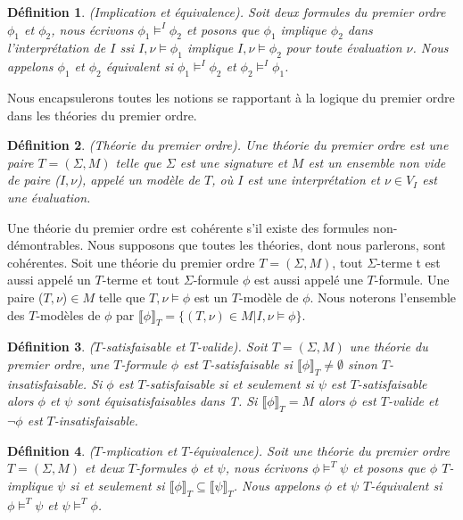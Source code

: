 \documentclass[11pt,openany]{article}
\newcommand\phibra{\llbracket\phi\rrbracket}
\newcommand\psibra{\llbracket\psi\rrbracket}
\newtheorem{definition}{D\'efinition}[subsection]
\begin{document}
\begin{definition}
(Implication et \'equivalence). Soit deux formules du premier ordre $\phi_{1}$ et $\phi_{2}$, nous \'ecrivons $\phi_{1}\models^{I}\phi_{2}$ et posons que $\phi_{1}$ implique $\phi_{2}$ dans l'interpr\'etation de $I$ ssi $I,\nu\models\phi_{1}$ implique $I,\nu\models\phi_{2}$ pour toute \'evaluation $\nu$. Nous appelons $\phi_{1}$  et $\phi_{2}$  \'equivalent si $\phi_{1}\models^{I}\phi_{2}$ et $\phi_{2}\models^{I}\phi_{1}$.
\end{definition}

	Nous encapsulerons toutes les notions se rapportant \`a la logique du premier ordre dans les th\'eories du premier ordre.

\begin{definition}
(Th\'eorie du premier ordre). Une th\'eorie du premier ordre est une paire $T=( \Sigma,M)$ telle que $ \Sigma$ est une signature et $M$ est un ensemble non vide de paire ($I,\nu$), appel\'e un mod\`ele de $T$, o\`u $I$ est une interpr\'etation et $\nu\in V_{I}$ est une \'evaluation.
\end{definition}

Une th\'eorie du premier ordre est coh\'erente s'il existe des formules non-d\'emontrables. Nous supposons que toutes les th\'eories, dont nous parlerons, sont coh\'erentes. Soit une th\'eorie du premier ordre $T = ( \Sigma,M)$, tout $ \Sigma$-terme t est aussi appel\'e un $T$-terme et tout $ \Sigma$-formule $\phi$ est aussi appel\'e une $T$-formule. Une paire ($T,\nu$)$\in M$ telle que $T,\nu\models\phi$ est un $T$-mod\`ele de $\phi$. Nous noterons l'ensemble des $T$-mod\`eles de $\phi$ par $\phibra_{T} = \{(T,\nu)\in M | I,\nu\models\phi\}$.

\begin{definition}
($T$-satisfaisable et $T$-valide). Soit $T = (\Sigma,M)$ une th\'eorie du premier ordre, une $T$-formule $\phi$ est $T$-satisfaisable si $\phibra_{T} \neq \emptyset$ sinon $T$-insatisfaisable. Si $\phi$ est $T$-satisfaisable si et seulement si $\psi$ est $T$-satisfaisable alors $\phi$ et $\psi$ sont \'equisatisfaisables dans T. Si $\phibra_{T} = M$ alors $\phi$ est $T$-valide et $\neg\phi$ est $T$-insatisfaisable.
\end{definition}

\begin{definition}
($T$-mplication et $T$-\'equivalence). Soit une th\'eorie du premier ordre $T = ( \Sigma,M)$ et deux $T$-formules $\phi$ et $\psi$, nous \'ecrivons $\phi\models^{T}\psi$ et posons que $\phi$ $T$-implique $\psi$ si et seulement si $\phibra_{T}\subseteq \psibra_{T}$. Nous appelons $\phi$  et $\psi$  $T$-\'equivalent si $\phi\models^{T}\psi$ et $\psi\models^{T}\phi$.
\end{definition}
\end{document}
